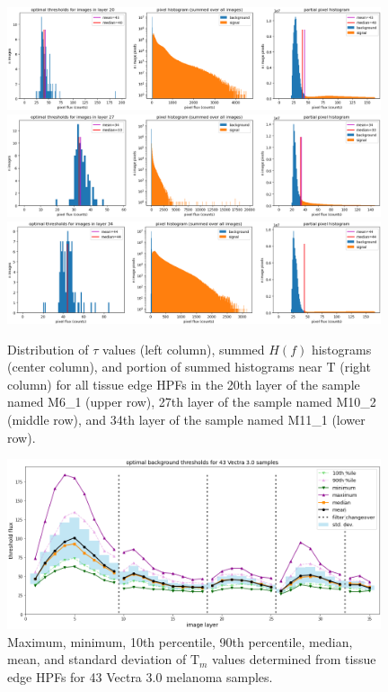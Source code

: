 \documentclass[letterpaper,11pt]{article}
\newcommand{\Tau}{\mathrm{T}}
\begin{document}
\begin{figure}[!ht]
\centering
\includegraphics[width=0.98\textwidth]{images/masking/M6_1_layer_20_background_threshold_plots}
\includegraphics[width=0.98\textwidth]{images/masking/M10_2_layer_27_background_threshold_plots}
\includegraphics[width=0.98\textwidth]{images/masking/M11_1_layer_34_background_threshold_plots}
\caption{\footnotesize Distribution of $\tau$ values (left column), summed $H(f)$ histograms (center column), and portion of summed histograms near $\Tau$ (right column) for all tissue edge HPFs in the 20th layer of the sample named M6\_1 (upper row), 27th layer of the sample named M10\_2 (middle row), and 34th layer of the sample named M11\_1 (lower row).}
\label{fig:threshold_distributions_2}
\end{figure}

\begin{figure}[!ht]
\centering
\includegraphics[width=0.98\textwidth]{images/masking/optimal_background_thresholds_batches_3-9_vectra_samples}
\caption{\footnotesize Maximum, minimum, 10th percentile, 90th percentile, median, mean, and standard deviation of $\Tau_{m}$ values determined from tissue edge HPFs for 43 Vectra 3.0 melanoma samples.}
\label{fig:all_sample_thresholds}
\end{figure}
\end{document}
